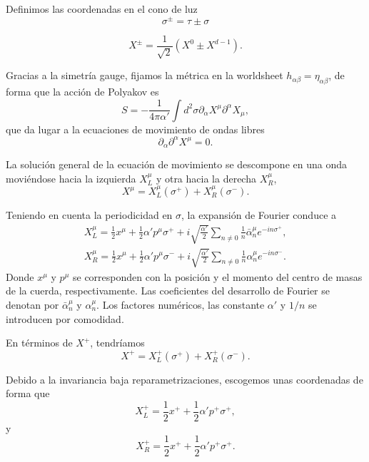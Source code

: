 Definimos las coordenadas en el cono de luz
\begin{equation}
  \sigma^\pm=\tau\pm\sigma
\end{equation}

\begin{equation}
  X^\pm=\frac{1}{\sqrt 2} (X^0 \pm X^{d-1}).
\end{equation}

Gracias a la simetría gauge, fijamos la métrica en la worldsheet $h_{\alpha\beta}=\eta_{\alpha\beta}$, de forma que 
la acción de Polyakov es
\begin{equation}
  S = -\frac{1}{4\pi\alpha'} \int d^2\sigma \partial_\alpha X^\mu \partial^\alpha X_\mu,
\end{equation}
que da lugar a la ecuaciones de movimiento de ondas libres
\begin{equation}
  \partial_\alpha \partial^\alpha X^\mu=0.
\end{equation}

La solución general de la ecuación de movimiento se descompone
en una onda moviéndose hacia la izquierda $X^\mu_L$ y otra hacia la derecha $X^\mu_R$,
\begin{equation}
   X^\mu =X^\mu_L(\sigma^+) + X^\mu_R(\sigma^-).
\end{equation}

Teniendo en cuenta la periodicidad en $\sigma$, la expansión de Fourier conduce a
\begin{equation}
  \begin{gathered}
    X^\mu_L=\frac 1 2 x^\mu + \frac 1 2 \alpha' p^\mu \sigma^+ + i\sqrt{\frac{\alpha'}{2}}\sum_{n\neq 0} \frac{1}{n}\bar \alpha^\mu_n e^{-in\sigma^+},\\
    X^\mu_R=\frac 1 2 x^\mu + \frac 1 2 \alpha' p^\mu \sigma^- +i\sqrt{\frac{\alpha'}{2}}\sum_{n\neq 0} \frac{1}{n}\alpha^\mu_n e^{-in\sigma^-}.
  \end{gathered}
\end{equation}
Donde $x^\mu$ y $p^\mu$ se corresponden con la posición y el momento del centro de masas de la cuerda, respectivamente. 
Las coeficientes del desarrollo de Fourier se denotan por $\bar \alpha^\mu_n$ y $\alpha^\mu_n$.
Los factores numéricos, las constante $\alpha'$ y $1/n$ se introducen por comodidad.

En términos de $X^+$, tendríamos
\begin{equation}
   X^+ =X^+_L(\sigma^+) + X^+_R(\sigma^-).
\end{equation}

Debido a la invariancia baja reparametrizaciones, escogemos unas coordenadas de forma que
\begin{equation}
  X^+_L=\frac 1 2 x^+ + \frac 1 2 \alpha' p^+ \sigma^+,
\end{equation}
y
\begin{equation}
  X^+_R=\frac 1 2 x^+ + \frac 1 2 \alpha' p^+ \sigma^+.
\end{equation}

